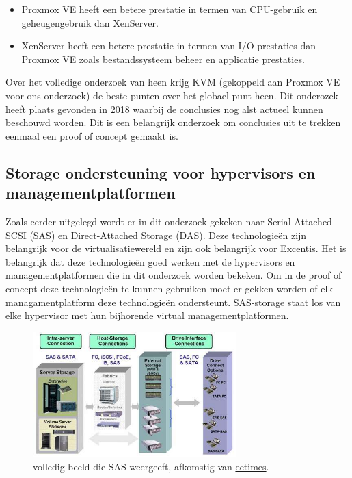 \begin{itemize}
    \item Proxmox VE heeft een betere prestatie in termen van CPU-gebruik en geheugengebruik dan XenServer.
    \item XenServer heeft een betere prestatie in termen van I/O-prestaties dan Proxmox VE zoals bestandssysteem beheer en applicatie prestaties.
\end{itemize}                               
Over het volledige onderzoek van \textcite{algarni2018performance} heen krijg KVM (gekoppeld aan Proxmox VE voor ons onderzoek) de beste punten over het globael punt heen. Dit onderozek heeft plaats gevonden in 2018 waarbij de conclusies nog alst actueel kunnen beschouwd worden.
Dit is een belangrijk onderzoek om conclusies uit te trekken eenmaal een proof of concept gemaakt is.

\subsection{Storage ondersteuning voor hypervisors en managementplatformen}

Zoals eerder uitgelegd wordt er in dit onderzoek gekeken naar Serial-Attached SCSI (SAS) en Direct-Attached Storage (DAS). Deze technologieën zijn belangrijk voor de virtualisatiewereld en zijn ook belangrijk voor Excentis. Het is belangrijk dat deze technologieën goed werken met de hypervisors en managementplatformen die in dit onderzoek worden bekeken.
Om in de proof of concept deze technologieën te kunnen gebruiken moet er gekken worden of elk managamentplatform deze technologieën ondersteunt.
SAS-storage staat los van elke hypervisor met hun bijhorende virtual managementplatformen.

\begin{figure}[h!]
    \centering
    \includegraphics[width=0.7\textwidth]{../onderzoek/storagesas-das.jpg} 
    \caption{volledig beeld die SAS weergeeft, afkomstig van \href{https://www.eetimes.com/serial-attached-scsi-storage-moves-ahead-in-network-server-designs/}{eetimes}.}
    \label{fig:sas}
\end{figure}

